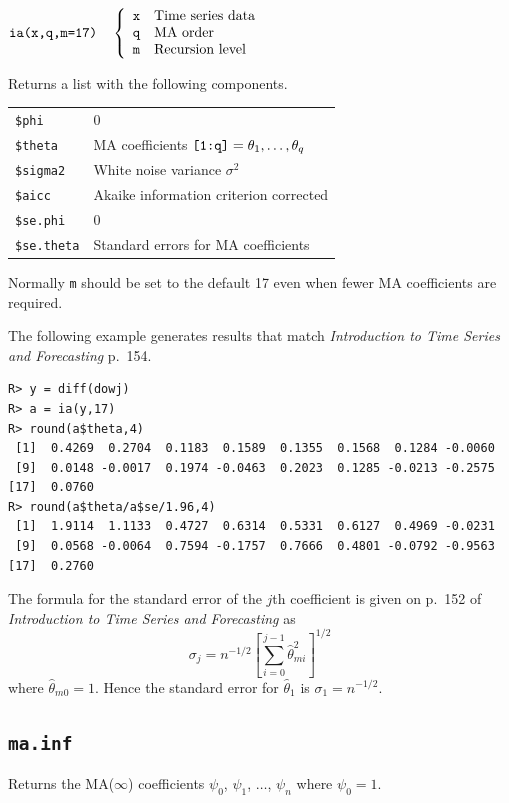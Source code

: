 \documentclass[12pt]{article}
\begin{document}
\bigskip
$
\hbox{\tt ia(x,q,m=17)}\quad\left\{\begin{array}{ll}
{\tt x} & \hbox{Time series data}\\
{\tt q} & \hbox{MA order}\\
{\tt m} & \hbox{Recursion level}
\end{array}\right.
$

\bigskip
\noindent
Returns a list with the following components.

\begin{center}
\begin{tabular}{ll}
{\tt \$phi} & 0\\
{\tt \$theta} & MA coefficients $\hbox{\tt[1:q]}=\theta_1,\ldots,\theta_q$\\
{\tt \$sigma2} & White noise variance $\sigma^2$\\
{\tt \$aicc} & Akaike information criterion corrected\\
{\tt \$se.phi} & 0\\
{\tt \$se.theta} & Standard errors for MA coefficients
\end{tabular}
\end{center}

\noindent
Normally {\tt m} should be set to the default 17 even when fewer MA coefficients
are required.

\bigskip
\noindent
The following example generates results that match
{\it Introduction to Time Series and Forecasting} p.\ 154.
\begin{verbatim}
R> y = diff(dowj)
R> a = ia(y,17)
R> round(a$theta,4)
 [1]  0.4269  0.2704  0.1183  0.1589  0.1355  0.1568  0.1284 -0.0060
 [9]  0.0148 -0.0017  0.1974 -0.0463  0.2023  0.1285 -0.0213 -0.2575
[17]  0.0760
R> round(a$theta/a$se/1.96,4)
 [1]  1.9114  1.1133  0.4727  0.6314  0.5331  0.6127  0.4969 -0.0231
 [9]  0.0568 -0.0064  0.7594 -0.1757  0.7666  0.4801 -0.0792 -0.9563
[17]  0.2760
\end{verbatim}

\noindent
The formula for the standard error of the $j$th coefficient is given
on p.\ 152 of {\it Introduction to Time Series and Forecasting} as
\[
\sigma_j=n^{-1/2}\left[\sum_{i=0}^{j-1}\hat\theta_{mi}^2\right]^{1/2}
\]
where $\hat\theta_{m0}=1$.
Hence the standard error for $\hat\theta_1$ is $\sigma_1=n^{-1/2}$.

\newpage

\subsection{\tt ma.inf}
Returns the MA($\infty$) coefficients
$\psi_0$, $\psi_1$, $\ldots$, $\psi_n$ where $\psi_0=1$.
\end{document}
